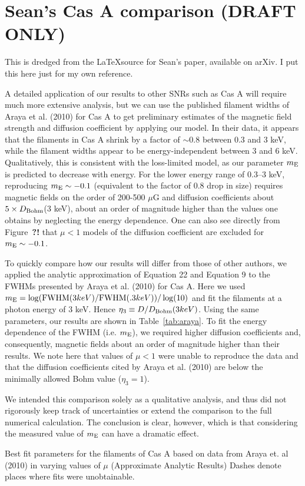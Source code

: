 \documentclass[iop, apj, numberedappendix, twocolappendix]{emulateapj}
\begin{document}
\section{Sean's Cas A comparison (DRAFT ONLY)}

This is dredged from the \LaTeX source for Sean's paper, available on arXiv.
I put this here just for my own reference.

A detailed application of our results to other SNRs such as Cas A will
require much more extensive analysis, but we can use the published
filament widths of Araya et al. (2010) for Cas A to get preliminary
estimates of the magnetic field strength and diffusion coefficient by
applying our model. In their data, it appears that the filaments in
Cas A shrink by a factor of $\sim 0.8$ between 0.3 and 3 keV, while the
filament widths appear to be energy-independent between 3 and 6 keV.
Qualitatively, this is consistent with the loss-limited model, as our
parameter $m_{\rm E}$ is predicted to decrease with energy.  For the
lower energy range of 0.3--3 keV, reproducing $m_{\rm E}\sim -0.1$
(equivalent to the factor of 0.8 drop in size) requires magnetic
fields on the order of 200-500 $\mu$G and diffusion coefficients about
$5 \times D_{\rm Bohm}$(3 keV), about an order of magnitude higher
than the values one obtains by neglecting the energy dependence. One
can also see directly from Figure~\textbf{?!} that $\mu < 1$ models
of the diffusion coefficient are excluded for $m_{\rm E}\sim -0.1$.

To quickly compare how our results will differ from those of other authors, we
applied the analytic approximation of Equation 22 and Equation 9 to the FWHMs
presented by Araya et al. (2010) for Cas A. Here we used $m_{\rm E} = \log(
{\rm FWHM}(3keV)/{\rm FWHM}(.3keV))/\log(10)$ and fit the filaments at a photon
energy of 3 keV.  Hence $\eta_3 \equiv D/D_{\rm Bohm}(3 keV)$. Using the same
parameters, our results are shown in Table~\ref{tab:araya}. To fit the energy
dependence of the FWHM (i.e. $m_{\rm E}$), we required higher diffusion
coefficients and, consequently, magnetic fields about an order of magnitude
higher than their results. We note here that values of $\mu<1$ were unable to
reproduce the data and that the diffusion coefficients cited by Araya et al.
(2010) are below the minimally allowed Bohm value ($\eta_3 = 1$).

We intended this comparison solely as a qualitative analysis, and thus did not
rigorously keep track of uncertainties or extend the comparison to the full
numerical calculation. The conclusion is clear, however, which is that
considering the measured value of $m_{\rm E}$ can have a dramatic effect.

\begin{table}[h]
\tiny
\centering
\caption{Best fit parameters for the filaments of Cas A based on data from
Araya et. al (2010) in varying values of $\mu$ (Approximate Analytic Results)
Dashes denote places where fits were unobtainable.}
\label{tab:araya}

\end{table}



\end{document}

